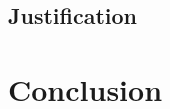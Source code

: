 \documentclass{report}
\begin{document}
	\section{Justification}
			 \label{justification}
			

\chapter{Conclusion}
			
%		
%		
%		
%		
%
\end{document}
